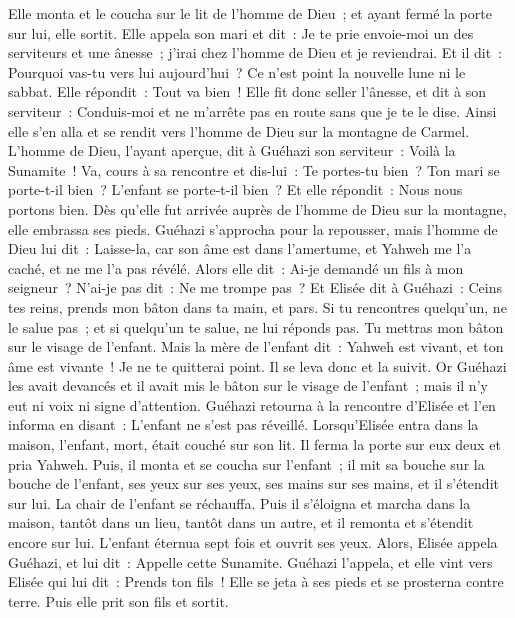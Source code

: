 \begin{multicols}{2}
Elle monta et le coucha sur le lit de l'homme de Dieu~; et ayant fermé la porte sur lui, elle sortit.
Elle appela son mari et dit~: Je te prie envoie-moi un des serviteurs et une ânesse~; j'irai chez l'homme de Dieu et je reviendrai.
Et il dit~: Pourquoi vas-tu vers lui aujourd'hui~? Ce n'est point la nouvelle lune ni le sabbat. Elle répondit~: Tout va bien~!
Elle fit donc seller l'ânesse, et dit à son serviteur~: Conduis-moi et ne m'arrête pas en route sans que je te le dise.
Ainsi elle s'en alla et se rendit vers l'homme de Dieu sur la montagne de Carmel. L'homme de Dieu, l'ayant aperçue, dit à Guéhazi son serviteur~: Voilà la Sunamite~!
Va, cours à sa rencontre et dis-lui~: Te portes-tu bien~? Ton mari se porte-t-il bien~? L'enfant se porte-t-il bien~? Et elle répondit~: Nous nous portons bien.
Dès qu'elle fut arrivée auprès de l'homme de Dieu sur la montagne, elle embrassa ses pieds. Guéhazi s'approcha pour la repousser, mais l'homme de Dieu lui dit~: Laisse-la, car son âme est dans l'amertume, et Yahweh me l'a caché, et ne me l'a pas révélé.
Alors elle dit~: Ai-je demandé un fils à mon seigneur~? N'ai-je pas dit~: Ne me trompe pas~?
Et Elisée dit à Guéhazi~: Ceins tes reins, prends mon bâton dans ta main, et pars. Si tu rencontres quelqu'un, ne le salue pas~; et si quelqu'un te salue, ne lui réponds pas. Tu mettras mon bâton sur le visage de l'enfant.
Mais la mère de l'enfant dit~: Yahweh est vivant, et ton âme est vivante~! Je ne te quitterai point. Il se leva donc et la suivit.
Or Guéhazi les avait devancés et il avait mis le bâton sur le visage de l'enfant~; mais il n'y eut ni voix ni signe d'attention. Guéhazi retourna à la rencontre d'Elisée et l'en informa en disant~: L'enfant ne s'est pas réveillé.
Lorsqu'Elisée entra dans la maison, l'enfant, mort, était couché sur son lit.
Il ferma la porte sur eux deux et pria Yahweh.
Puis, il monta et se coucha sur l'enfant~; il mit sa bouche sur la bouche de l'enfant, ses yeux sur ses yeux, ses mains sur ses mains, et il s'étendit sur lui. La chair de l'enfant se réchauffa.
Puis il s'éloigna et marcha dans la maison, tantôt dans un lieu, tantôt dans un autre, et il remonta et s'étendit encore sur lui. L'enfant éternua sept fois et ouvrit ses yeux.
Alors, Elisée appela Guéhazi, et lui dit~: Appelle cette Sunamite. Guéhazi l'appela, et elle vint vers Elisée qui lui dit~: Prends ton fils~!
Elle se jeta à ses pieds et se prosterna contre terre. Puis elle prit son fils et sortit.

\end{multicols}
